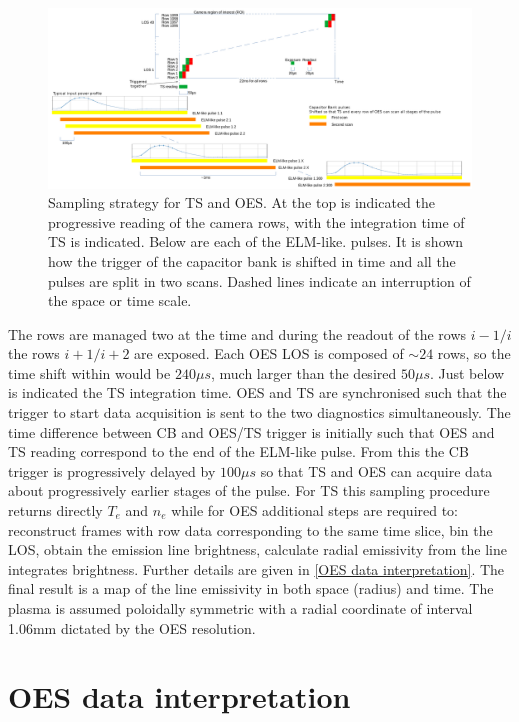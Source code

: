 \begin{figure}
	\centering
	\includegraphics[width=\linewidth,trim={0 0 0 0},clip]{Chapters/chapter3/figs/sampling_strategy_2.png}
	\caption{Sampling strategy for TS and OES. At the top is indicated the progressive reading of the camera rows, with the integration time of TS is indicated. Below are each of the ELM-like. pulses. It is shown how the trigger of the capacitor bank is shifted in time and all the pulses are split in two scans. Dashed lines indicate an interruption of the space or time scale.}
	\label{fig:sampling1}
\end{figure}

The rows are managed two at the time and during the readout of the rows $i-1/i$ the rows $i+1/i+2$ are exposed. Each OES LOS is composed of $\sim 24$ rows, so the time shift within would be $240\mu s$, much larger than the desired $50 \mu s$. Just below is indicated the TS integration time. OES and TS are synchronised such that the trigger to start data acquisition is sent to the two diagnostics simultaneously.
The time difference between CB and OES/TS trigger is initially such that OES and TS reading correspond to the end of the ELM-like pulse. From this the CB trigger is progressively delayed by $100\mu s$ so that TS and OES can acquire data about progressively earlier stages of the pulse.
For TS this sampling procedure returns directly $T_e$ and $n_e$ while for OES additional steps are required to: reconstruct frames with row data corresponding to the same time slice, bin the LOS, obtain the emission line brightness, calculate radial emissivity from the line integrates brightness. Further details are given in \autoref{OES data interpretation}. The final result is a map of the line emissivity in both space (radius) and time. The plasma is assumed poloidally symmetric with a radial coordinate of interval 1.06mm dictated by the OES resolution.

\section{OES data interpretation}\label{OES data interpretation}

